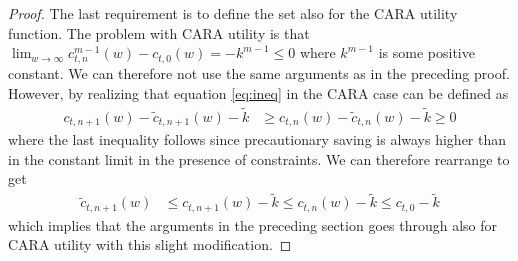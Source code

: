 \documentclass[titlepage]{\econtex}
\begin{document}
\begin{proof}
    The last requirement is to define the set also for the CARA utility function. The problem with CARA utility is that $\lim_{w\rightarrow \infty} c_{t,n}^{m-1}(w) - c_{t,0}(w) = - k^{m-1} \leq 0$ where $k^{m-1}$ is some positive constant. We can therefore not use the same arguments as in the preceding proof. However, by realizing that equation \eqref{eq:ineq} in the CARA case can be defined as
    \begin{align*}
      c_{t,n+1}(w) - \tilde{c}_{t,n+1}(w) - \tilde{k} &\geq c_{t,n}(w)-\tilde{c}_{t,n}(w) -  \tilde{k} \geq 0 
    \end{align*}
    where the last inequality follows since precautionary saving is always higher than in the constant limit in the presence of constraints. We can therefore rearrange to get
    \begin{align*}
      \tilde{c}_{t,n+1}(w)  &\leq c_{t,n+1}(w) - \tilde{k} \leq c_{t,n}(w) - \tilde{k} \leq c_{t,0} - \tilde{k}	\end{align*}
    which implies that the arguments in the preceding section goes through also for CARA utility with this slight modification. 
    
  \end{proof}
\end{document}
